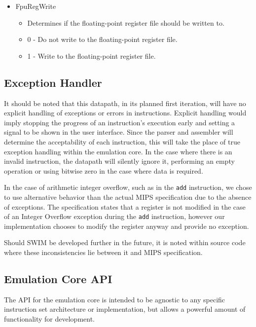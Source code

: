 \documentclass[
    paper=letter,
    parskip=half,
    fontsize=12pt,
    titlepage=firstiscover,
    toc=bibliography,
    numbers=endperiod
]{scrartcl}
\providecommand{\tightlist}{%
  \setlength{\itemsep}{0pt}\setlength{\parskip}{0pt}}
\begin{document}
\begin{itemize}
    \item FpuRegWrite
          \begin{itemize}
              \tightlist
              \item Determines if the floating-point register file should be written to.
              \item 0 - Do not write to the floating-point register file.
              \item 1 - Write to the floating-point register file.
          \end{itemize}
\end{itemize}

\subsection{Exception Handler}

It should be noted that this datapath, in its planned first iteration,
will have no explicit handling of exceptions or errors in instructions.
Explicit handling would imply stopping the progress of an instruction's
execution early and setting a signal to be shown in the user interface.
Since the parser and assembler will determine the acceptability of each
instruction, this will take the place of true exception handling within
the emulation core. In the case where there is an invalid instruction,
the datapath will silently ignore it, performing an empty operation or
using bitwise zero in the case where data is required.

In the case of arithmetic integer overflow, such as in the \texttt{add}
instruction, we chose to use alternative behavior than the actual MIPS
specification due to the absence of exceptions. The specification states
that a register is not modified in the case of an Integer Overflow exception
during the \texttt{add} instruction, however our implementation chooses
to modify the register anyway and provide no exception.

Should SWIM be developed further in the future, it is noted within source
code where these inconsistencies lie between it and MIPS specification.

\subsection{Emulation Core API}
\label{subsec:emulation-core-api}

The API for the emulation core is intended to be agnostic to any
specific instruction set architecture or implementation, but allows a
powerful amount of functionality for development.
\end{document}
